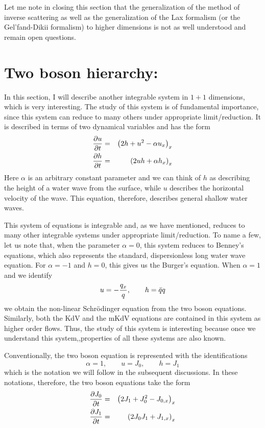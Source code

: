 \documentclass[a4paper,11pt]{article}
\begin{document}
Let me note in closing this section that the generalization of the
method of  inverse scattering as well as the generalization of the Lax
formalism (or the Gel'fand-Dikii formalism) to higher dimensions is
not as well understood and remain open questions.

\section{Two boson hierarchy:}

In this section, I will describe another integrable system in $1+1$
dimensions, which is very interesting. The study of this system is of
fundamental importance, since this system can reduce to many others
under appropriate limit/reduction. It is described in terms of two
dynamical variables and has the form
\begin{eqnarray}
{\partial u\over \partial t} & = & \left(2h + u^{2} - \alpha
u_{x}\right)_{x}\nonumber\\
{\partial h\over \partial t} & = & \left(2uh + \alpha h_{x}\right)_{x}
\end{eqnarray}
Here $\alpha$ is an arbitrary constant parameter and we can think of
$h$ as describing the height of a water wave from the surface, while
$u$ describes the horizontal velocity of the wave. This equation,
therefore, describes general shallow water waves.

This system of equations is integrable and, as we have mentioned,
reduces to many other integrable systems under appropriate
limit/reduction. To name a few, let us note that, when the parameter
$\alpha = 0$, this system reduces to Benney's equations, which also
represents the standard, dispersionless long water wave equation. For
$\alpha = -1$ and $h = 0$, this gives us the Burger's equation. When
$\alpha =1$ and we identify
$$
u = - {q_{x}\over q},\qquad h = \bar{q}q
$$
we obtain the non-linear Schr\"{o}dinger equation from the two boson
equations. Similarly, both the KdV and the mKdV equations are
contained in this system as higher order flows. Thus, the study of this
system is interesting because once we understand this
system,,properties of all these systems are also known.

Conventionally, the two boson equation is represented with the
identifications
\begin{equation}
\alpha = 1,\qquad u = J_{0},\qquad h = J_{1}
\end{equation}
which is the notation we will follow in the subsequent discussions. In
these notations, therefore, the two boson equations take the form
\begin{eqnarray}
{\partial J_{0}\over \partial t} & = & \left(2J_{1} + J_{0}^{2} -
J_{0,x}\right)_{x}\nonumber\\
{\partial J_{1}\over \partial t} & = & \left(2J_{0}J_{1} +
J_{1,x}\right)_{x}
\end{eqnarray}
\end{document}
